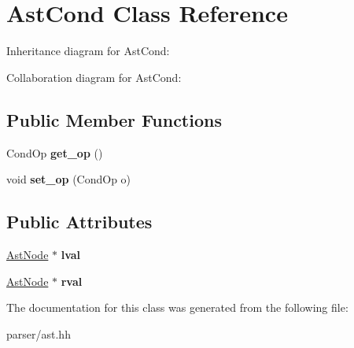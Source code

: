 \hypertarget{classAstCond}{}\section{Ast\+Cond Class Reference}
\label{classAstCond}


Inheritance diagram for Ast\+Cond\+:


Collaboration diagram for Ast\+Cond\+:
\subsection*{Public Member Functions}
\begin{DoxyCompactItemize}
\item 
\mbox{\label{classAstCond_a37b8679af98b70b7a624bccc50e91355}} 
Cond\+Op {\bfseries get\+\_\+op} ()
\item 
\mbox{\label{classAstCond_a05e150297dba677cbb2655f1a941fef4}} 
void {\bfseries set\+\_\+op} (Cond\+Op o)
\end{DoxyCompactItemize}
\subsection*{Public Attributes}
\begin{DoxyCompactItemize}
\item 
\mbox{\label{classAstCond_aab4d80ed820d969acdd8cfc96fc748ad}} 
\hyperlink{classAstNode}{Ast\+Node} $\ast$ {\bfseries lval}
\item 
\mbox{\label{classAstCond_a5e917c03b656aa24475885e3681e6a1a}} 
\hyperlink{classAstNode}{Ast\+Node} $\ast$ {\bfseries rval}
\end{DoxyCompactItemize}


The documentation for this class was generated from the following file\+:\begin{DoxyCompactItemize}
\item 
parser/ast.\+hh\end{DoxyCompactItemize}

